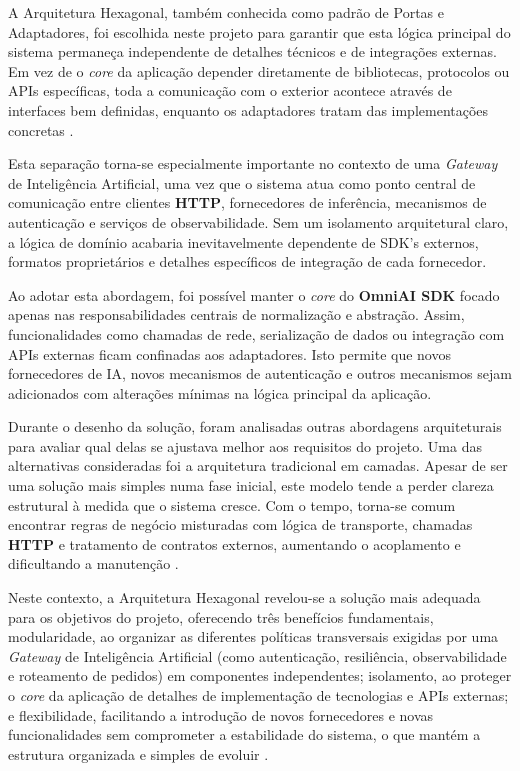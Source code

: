 A Arquitetura Hexagonal, também conhecida como padrão de Portas e Adaptadores, foi escolhida neste projeto para garantir que esta lógica principal do sistema permaneça independente de detalhes técnicos e de integrações externas. Em vez de o \textit{core} da aplicação depender diretamente de bibliotecas, protocolos ou APIs específicas, toda a comunicação com o exterior acontece através de interfaces bem definidas, enquanto os adaptadores tratam das implementações concretas \cite{gfg_hexagonal_architecture, hexagonal_ports, netflix_hexagonal}.

Esta separação torna-se especialmente importante no contexto de uma \textit{Gateway} de Inteligência Artificial, uma vez que o sistema atua como ponto central de comunicação entre clientes \textbf{HTTP}, fornecedores de inferência, mecanismos de autenticação e serviços de observabilidade. Sem um isolamento arquitetural claro, a lógica de domínio acabaria inevitavelmente dependente de SDK's externos, formatos proprietários e detalhes específicos de integração de cada fornecedor.

Ao adotar esta abordagem, foi possível manter o \textit{core} do \textbf{OmniAI SDK} focado apenas nas responsabilidades centrais de normalização e abstração. Assim, funcionalidades como chamadas de rede, serialização de dados ou integração com APIs externas ficam confinadas aos adaptadores. Isto permite que novos fornecedores de IA, novos mecanismos de autenticação e outros mecanismos sejam adicionados com alterações mínimas na lógica principal da aplicação.

Durante o desenho da solução, foram analisadas outras abordagens arquiteturais para avaliar qual delas se ajustava melhor aos requisitos do projeto. Uma das alternativas consideradas foi a arquitetura tradicional em camadas\cite{ref_arqCamadas_medium}. Apesar de ser uma solução mais simples numa fase inicial, este modelo tende a perder clareza estrutural à medida que o sistema cresce. Com o tempo, torna-se comum encontrar regras de negócio misturadas com lógica de transporte, chamadas \textbf{HTTP} e tratamento de contratos externos, aumentando o acoplamento e dificultando a manutenção \cite{graca_explicit_architecture}.

Neste contexto, a Arquitetura Hexagonal revelou-se a solução mais adequada para os objetivos do projeto, oferecendo três benefícios fundamentais, modularidade, ao organizar as diferentes políticas transversais exigidas por uma \textit{Gateway} de Inteligência Artificial (como autenticação, resiliência, observabilidade e roteamento de pedidos) em componentes independentes; isolamento, ao proteger o \textit{core} da aplicação de detalhes de implementação de tecnologias e APIs externas; e flexibilidade, facilitando a introdução de novos fornecedores e novas funcionalidades sem comprometer a estabilidade do sistema, o que mantém a estrutura organizada e simples de evoluir \cite{api_gateway_design, ai_gateway_pattern, karl_ai_gateway}.

